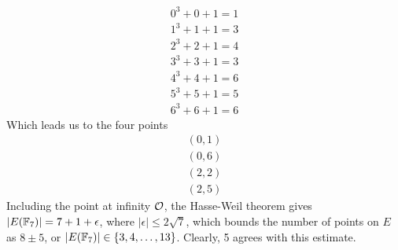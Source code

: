 \begin{align*}
0^3 + 0 + 1 = 1\\
1^3 + 1 + 1 = 3\\
2^3 + 2 + 1 = 4\\
3^3 + 3 + 1 = 3\\
4^3 + 4 + 1 = 6\\
5^3 + 5 + 1 = 5\\
6^3 + 6 + 1 = 6
\end{align*}
Which leads us to the four points
\begin{align*}
(0,1)\\
(0,6)\\
(2,2)\\
(2,5)
\end{align*}
Including the point at infinity $\pai$, the Hasse-Weil theorem gives $|E(\fp[7])| = 7 + 1 + \epsilon$, where $|\epsilon| \leq 2\sqrt{7}$, which bounds the number of points on $E$ as $8\pm5$, or $|E(\fp[7])| \in \{3,4,\ldots,13\}$.
Clearly, 5 agrees with this estimate.
